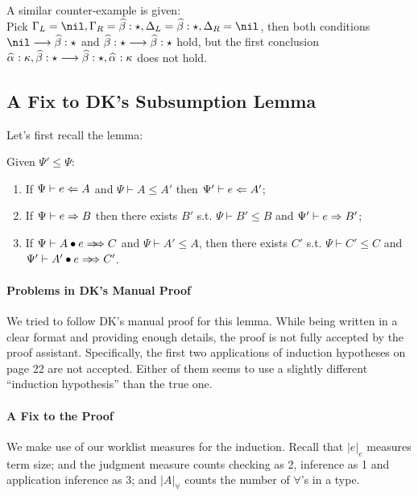 \begin{itemize}
        A similar counter-example is given:\\
        Pick $\Gm_L = \nil, \Gm_R = \bt:\star, \Delta_L = \bt:\star, \Delta_R = \nil$, then both conditions
        $\nil\longrightarrow \bt:\star$ and $\bt:\star\longrightarrow \bt:\star$ hold, but the first conclusion
        $\al:\kappa,\bt:\star \longrightarrow \bt:\star,\al:\kappa$ does not hold.
\end{itemize}

\subsection{A Fix to DK's Subsumption Lemma}
\label{appendix:subsumption}

Let's first recall the lemma:
\begin{lemma}[Subsumption]
Given $\Psi' \le \Psi$:
\begin{enumerate}
    \item If $\Psi \vdash e \Leftarrow A$ and $\Psi \vdash A \le A'$ then $\Psi' \vdash e \Leftarrow A'$;
    \item If $\Psi \vdash e \Rightarrow B$ then there exists
        $B'$ s.t. $\Psi \vdash B' \le B$ and $\Psi' \vdash e \Rightarrow B'$;
    \item If $\Psi \vdash \appInf{A}{e}{C}$ and $\Psi \vdash A' \le A$,
        then there exists $C'$ s.t. $\Psi \vdash C' \le C$ and $\Psi' \vdash \appInf{A'}{e}{C'}$.
\end{enumerate}
\end{lemma}

\paragraph{Problems in DK's Manual Proof}
We tried to follow DK's manual proof for this lemma.
While being written in a clear format and providing enough details,
the proof is not fully accepted by the proof assistant.
Specifically, the first two applications of induction hypotheses on page 22 are not accepted.
Either of them seems to use a slightly different ``induction hypothesis'' than the true one.

\paragraph{A Fix to the Proof}
We make use of our worklist measures for the induction.
Recall that $|e|_e$ measures term size;
and the judgment measure counts checking as 2, inference as 1 and application inference as 3;
and $|A|_\forall$ counts the number of $\forall$'s in a type.

